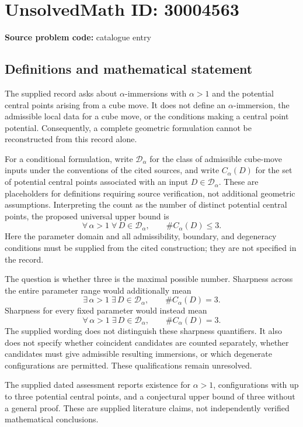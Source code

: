 \documentclass[11pt]{article}
\begin{document}
\section*{UnsolvedMath ID: 30004563}
\textbf{Source problem code:} catalogue entry
\subsection{Definitions and mathematical statement}
The supplied record asks about \(\alpha\)-immersions with \(\alpha>1\) and the potential central points arising from a cube move. It does not define an \(\alpha\)-immersion, the admissible local data for a cube move, or the conditions making a central point potential. Consequently, a complete geometric formulation cannot be reconstructed from this record alone.

For a conditional formulation, write \(\mathcal D_\alpha\) for the class of admissible cube-move inputs under the conventions of the cited sources, and write \(C_\alpha(D)\) for the set of potential central points associated with an input \(D\in\mathcal D_\alpha\). These are placeholders for definitions requiring source verification, not additional geometric assumptions. Interpreting the count as the number of distinct potential central points, the proposed universal upper bound is
\[
\forall\,\alpha>1\;\forall\,D\in\mathcal D_\alpha,
\qquad \#C_\alpha(D)\leq 3.
\]
Here the parameter domain and all admissibility, boundary, and degeneracy conditions must be supplied from the cited construction; they are not specified in the record.

The question is whether three is the maximal possible number. Sharpness across the entire parameter range would additionally mean
\[
\exists\,\alpha>1\;\exists\,D\in\mathcal D_\alpha,
\qquad \#C_\alpha(D)=3.
\]
Sharpness for every fixed parameter would instead mean
\[
\forall\,\alpha>1\;\exists\,D\in\mathcal D_\alpha,
\qquad \#C_\alpha(D)=3.
\]
The supplied wording does not distinguish these sharpness quantifiers. It also does not specify whether coincident candidates are counted separately, whether candidates must give admissible resulting immersions, or which degenerate configurations are permitted. These qualifications remain unresolved.

The supplied dated assessment reports existence for \(\alpha>1\), configurations with up to three potential central points, and a conjectural upper bound of three without a general proof. These are supplied literature claims, not independently verified mathematical conclusions.
\end{document}
